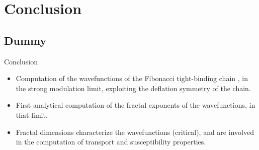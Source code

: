 \documentclass[xcolor=x11names,compress,professionalfonts]{beamer}
\renewcommand{\(}{\begin{columns}}
\renewcommand{\)}{\end{columns}}
\newcommand{\<}[1]{\begin{column}{#1}}
\renewcommand{\>}{\end{column}}
\begin{document}
\section{Conclusion}
\subsection{Dummy}
\begin{frame}{Conclusion}
\begin{itemize}
	\item Computation of the wavefunctions of the Fibonacci tight-binding chain , in the strong modulation limit, exploiting the deflation symmetry of the chain.
	\item First analytical computation of the fractal exponents of the wavefunctions, in that limit.
	\[\phantom{ ~}\]
	\item Fractal dimensions characterize the wavefunctions (critical), and are involved in the computation of transport and susceptibility properties.
\end{itemize}
\end{frame}
\end{document}

